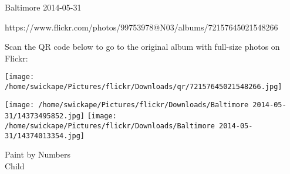 \documentclass[10pt,letterpaper]{article}
\begin{document}
Baltimore 2014-05-31

https://www.flickr.com/photos/99753978@N03/albums/72157645021548266

Scan the QR code below to go to the original album with full-size photos on Flickr:

\texttt{[image: /home/swickape/Pictures/flickr/Downloads/qr/72157645021548266.jpg]}
\pagebreak

\texttt{[image: /home/swickape/Pictures/flickr/Downloads/Baltimore 2014-05-31/14373495852.jpg]}
\texttt{[image: /home/swickape/Pictures/flickr/Downloads/Baltimore 2014-05-31/14374013354.jpg]}

Paint by Numbers\\
Child
\pagebreak
\end{document}
